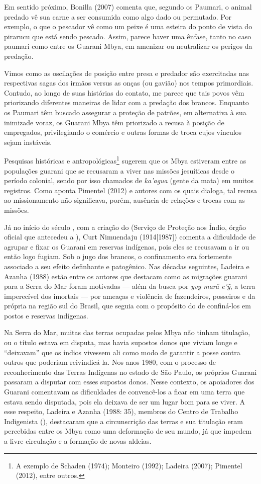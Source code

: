 {Em sentido próximo, Bonilla (2007) comenta que, segundo os Paumari, o
animal predado vê sua carne a ser consumida como algo dado ou
permutado. Por exemplo, o que o pescador vê como um peixe é uma esteira
do ponto de vista do pirarucu que está sendo pescado. Assim, parece
haver uma ênfase, tanto no caso paumari como entre os Guarani Mbya, em
amenizar ou neutralizar os perigos da predação. 

Vimos como as oscilações de posição entre presa e predador são
exercitadas nas respectivas sagas dos irmãos versus as onças (ou
gavião) nos tempos primordiais. Contudo, ao longo de suas histórias do
contato, me parece que tais povos vêm priorizando diferentes maneiras
de lidar com a predação dos brancos. Enquanto os Paumari têm buscado
assegurar a proteção de patrões, em alternativa à sua inimizade voraz,
os Guarani Mbya têm priorizado a recusa à posição de empregados,
privilegiando o comércio e outras formas de troca cujos vínculos sejam
instáveis.

Pesquisas históricas e antropológicas\footnote{A exemplo de Schaden
(1974); Monteiro (1992); Ladeira (2007); Pimentel (2012), entre
outros.} sugerem que os Mbya estiveram entre as populações guarani que
se recusaram a viver nas missões jesuíticas desde o período colonial,
sendo por isso chamados de \emph{ka’agua} (gente da mata) em muitos registros.
Como aponta Pimentel (2012) e autores com os quais dialoga, tal recusa
ao missionamento não significava, porém, ausência de relações e trocas
com as missões.

Já no início do século , com a criação do  (Serviço de Proteção aos
Índio, órgão oficial que antecedeu a ), Curt Nimuendaju
(1914[1987]) comenta a dificuldade de agrupar e fixar os Guarani em
reservas indígenas, pois eles se recusavam a ir ou então logo fugiam.
Sob o jugo dos brancos, o confinamento era fortemente associado a seu
efeito definhante e patogênico. Nas décadas seguintes, Ladeira e Azanha
(1988) estão entre os autores que destacam como as migrações guarani
para a Serra do Mar foram motivadas --- além da busca por \emph{yvy marã
e’\~{y}}, a terra imperecível dos imortais --- por ameaças e violência de
fazendeiros, posseiros e da própria  na região sul do Brasil, que
seguia com o propósito do  de confiná-los em postos e reservas
indígenas.

Na Serra do Mar, muitas das terras ocupadas pelos Mbya não tinham
titulação, ou o título estava em disputa, mas havia supostos donos que
viviam longe e ``deixavam'' que os índios vivessem ali como modo de
garantir a posse contra outros que poderiam reivindicá-la. Nos anos
1980, com o processo de reconhecimento das Terras Indígenas no estado
de São Paulo, os próprios Guarani passaram a disputar com esses
supostos donos. Nesse contexto, os apoiadores dos Guarani comentavam as
dificuldades de convencê-los a ficar em uma terra que estava sendo
disputada, pois ela deixava de ser um lugar bom para se viver. A esse
respeito, Ladeira e Azanha (1988: 35), membros do Centro de Trabalho
Indigenista (), destacaram que a circunscrição das terras e sua
titulação eram percebidas entre os Mbya como uma deformação de seu
mundo, já que impedem a livre circulação e a formação de novas aldeias.

}
